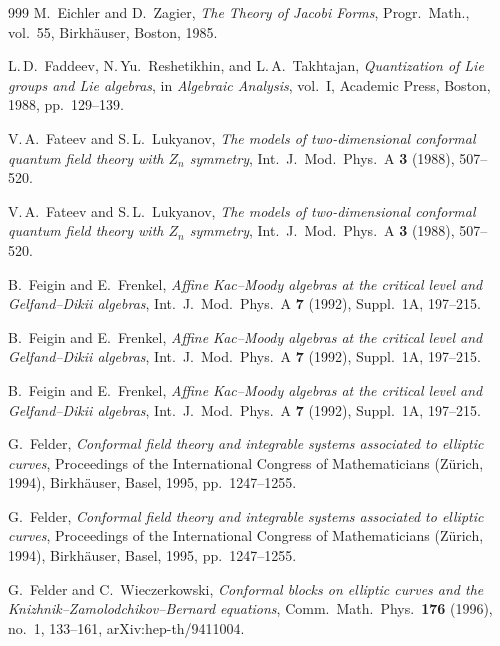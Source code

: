 \documentclass[11pt]{memoir}
\begin{document}
\begin{thebibliography}{999}
M.~Eichler and D.~Zagier, \emph{The Theory of Jacobi Forms}, Progr.\ Math., vol.~55, Birkh\"auser, Boston, 1985.

L.\,D.~Faddeev, N.\,Yu.~Reshetikhin, and L.\,A.~Takhtajan, \emph{Quantization of Lie groups and Lie algebras}, in \emph{Algebraic Analysis}, vol.~I, Academic Press, Boston, 1988, pp.~129--139.

V.\,A.~Fateev and S.\,L.~Lukyanov, \emph{The models of two-dimensional conformal quantum field theory with $Z_n$ symmetry}, Int.\ J.\ Mod.\ Phys.\ A \textbf{3} (1988), 507--520.

V.\,A.~Fateev and S.\,L.~Lukyanov, \emph{The models of two-dimensional conformal quantum field theory with $Z_n$ symmetry}, Int.\ J.\ Mod.\ Phys.\ A \textbf{3} (1988), 507--520.

B.~Feigin and E.~Frenkel, \emph{Affine Kac--Moody algebras at the critical level and Gelfand--Dikii algebras}, Int.\ J.\ Mod.\ Phys.\ A \textbf{7} (1992), Suppl.~1A, 197--215.

B.~Feigin and E.~Frenkel, \emph{Affine Kac--Moody algebras at the critical level and Gelfand--Dikii algebras}, Int.\ J.\ Mod.\ Phys.\ A \textbf{7} (1992), Suppl.~1A, 197--215.

B.~Feigin and E.~Frenkel, \emph{Affine Kac--Moody algebras at the critical level and Gelfand--Dikii algebras}, Int.\ J.\ Mod.\ Phys.\ A \textbf{7} (1992), Suppl.~1A, 197--215.

G.~Felder, \emph{Conformal field theory and integrable systems associated to elliptic curves}, Proceedings of the International Congress of Mathematicians (Z\"urich, 1994), Birkh\"auser, Basel, 1995, pp.~1247--1255.

G.~Felder, \emph{Conformal field theory and integrable systems associated to elliptic curves}, Proceedings of the International Congress of Mathematicians (Z\"urich, 1994), Birkh\"auser, Basel, 1995, pp.~1247--1255.

G.~Felder and C.~Wieczerkowski, \emph{Conformal blocks on elliptic curves and the Knizhnik--Zamolodchikov--Bernard equations}, Comm.\ Math.\ Phys.\ \textbf{176} (1996), no.~1, 133--161, arXiv:hep-th/9411004.


\end{thebibliography}
\end{document}
